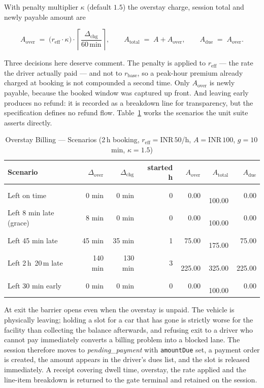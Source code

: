 \documentclass[journal,onecolumn,11pt]{IEEEtran}
\newcommand{\rs}{\text{INR}\,}
\begin{document}
With penalty multiplier $\kappa$ (default $1.5$) the overstay charge, session
total and newly payable amount are

\begin{equation}
  A_{\text{over}} \;=\;
    \bigl(r_{\text{eff}} \cdot \kappa\bigr)\cdot
    \left\lceil \frac{\Delta_{\text{chg}}}{60\,\text{min}} \right\rceil,
  \qquad
  A_{\text{total}} \;=\; A + A_{\text{over}},
  \qquad
  A_{\text{due}} \;=\; A_{\text{over}}.
  \label{eq:overstaycharge}
\end{equation}

Three decisions here deserve comment. The penalty is applied to
$r_{\text{eff}}$ --- the rate the driver actually paid --- and not to
$r_{\text{base}}$, so a peak-hour premium already charged at booking is not
compounded a second time. Only $A_{\text{over}}$ is newly payable, because the
booked window was captured up front. And leaving early produces no refund: it
is recorded as a breakdown line for transparency, but the specification defines
no refund flow. Table~\ref{tab:overstay} works the scenarios the unit suite
asserts directly.

\begin{table}[!t]
\caption{Overstay Billing --- Scenarios
  (2\,h booking, $r_{\text{eff}} = \rs 50$/h, $A = \rs 100$, $g = 10$\,min,
   $\kappa = 1.5$)}
\label{tab:overstay}
\centering
\small
\begin{tabular}{@{}lrrrrrr@{}}
\toprule
\textbf{Scenario} & $\Delta_{\text{over}}$ & $\Delta_{\text{chg}}$
  & \textbf{started h} & $A_{\text{over}}$ & $A_{\text{total}}$
  & $A_{\text{due}}$ \\
\midrule
Left on time              & 0 min   & 0 min   & 0 & \rs 0.00   & \rs 100.00 & \rs 0.00 \\
Left 8 min late (grace)   & 8 min   & 0 min   & 0 & \rs 0.00   & \rs 100.00 & \rs 0.00 \\
Left 45 min late          & 45 min  & 35 min  & 1 & \rs 75.00  & \rs 175.00 & \rs 75.00 \\
Left 2\,h~20\,m late      & 140 min & 130 min & 3 & \rs 225.00 & \rs 325.00 & \rs 225.00 \\
Left 30 min early         & 0 min   & 0 min   & 0 & \rs 0.00   & \rs 100.00 & \rs 0.00 \\
\bottomrule
\end{tabular}
\end{table}

At exit the barrier opens even when the overstay is unpaid. The vehicle is
physically leaving; holding a slot for a car that has gone is strictly worse
for the facility than collecting the balance afterwards, and refusing exit to a
driver who cannot pay immediately converts a billing problem into a blocked
lane. The session therefore moves to \textit{pending\_payment} with
\texttt{amountDue} set, a payment order is created, the amount appears in the
driver's dues list, and the slot is released immediately. A receipt covering
dwell time, overstay, the rate applied and the line-item breakdown is returned
to the gate terminal and retained on the session.
\end{document}
